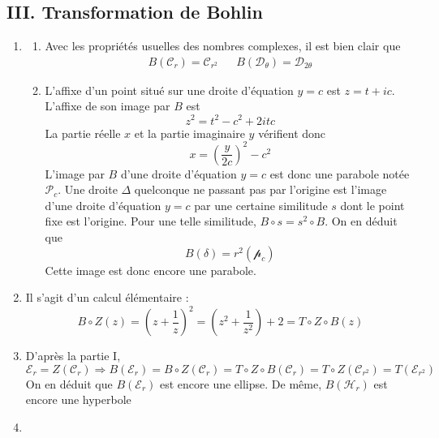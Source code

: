 \subsection*{III. Transformation de Bohlin}
\begin{enumerate}
 \item \begin{enumerate}
\item Avec les propriétés usuelles des nombres complexes, il est bien clair que
\begin{align*}
 B(\mathcal{C} _r)= \mathcal C _{r^2} & & B(\mathcal D _\theta) = \mathcal D _{2\theta }
\end{align*}

\item L'affixe d'un point situé sur une droite d'équation $y=c$ est $z=t+ic$. L'affixe de son image par $B$ est
\begin{displaymath}
 z^2 = t^2-c^2 +2itc
\end{displaymath}
La partie réelle $x$ et la partie imaginaire $y$ vérifient donc 
\begin{displaymath}
 x= \left( \dfrac{y}{2c}\right)^2 - c^2 
\end{displaymath}
L'image par $B$ d'une droite d'équation $y=c$ est donc une parabole notée $\mathcal P_c$.\newline
Une droite $\Delta$ quelconque ne passant pas par l'origine est l'image d'une droite d'équation $y=c$ par une certaine similitude $s$ dont le point fixe est l'origine. Pour une telle similitude, $B\circ s = s^2 \circ B$. On en déduit que 
\begin{displaymath}
 B(\delta) = r^2(\mathcal p_c)
\end{displaymath}
Cette image est donc encore une parabole.
\end{enumerate}

 \item Il s'agit d'un calcul élémentaire :
\begin{displaymath}
 B\circ Z(z)=\left(z+\dfrac{1}{z} \right)^2
=(z^2 + \dfrac{1}{z^2})+2
=T\circ Z \circ B(z) 
\end{displaymath}

 \item D'après la partie I, 
\begin{displaymath}
 \mathcal E_r = Z(\mathcal C_r) \Rightarrow
B(\mathcal E_r) = B\circ Z (\mathcal C_r)= T\circ Z \circ B(\mathcal C_r)
=T\circ Z (\mathcal C_{r^2})= T(\mathcal E_{r^2})
\end{displaymath}
On en déduit que $B(\mathcal E_r)$ est encore une ellipse. De même, $B(\mathcal H_r)$ est encore une hyperbole 
\item
\end{enumerate}
